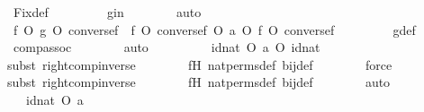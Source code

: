 \begin{isabellebody}
\ Fix{\isacharunderscore}{\kern0pt}def\ \isanewline
\ \ \ \ \ \ \isamarkupfalse%
\ gin\isanewline
\ \ \ \ \ \ \isamarkupfalse%
\ auto\isanewline
\isanewline
\ \ \ \ \isamarkupfalse%
\ {\isachardoublequoteopen}f\ O\ g\ O\ converse{\isacharparenleft}{\kern0pt}f{\isacharparenright}{\kern0pt}\ {\isacharequal}{\kern0pt}\ {\isacharparenleft}{\kern0pt}f\ O\ converse{\isacharparenleft}{\kern0pt}f{\isacharparenright}{\kern0pt}{\isacharparenright}{\kern0pt}\ O\ a\ O\ {\isacharparenleft}{\kern0pt}f\ O\ converse{\isacharparenleft}{\kern0pt}f{\isacharparenright}{\kern0pt}{\isacharparenright}{\kern0pt}{\isachardoublequoteclose}\ \isanewline
\ \ \ \ \ \ \isamarkupfalse%
\ g{\isacharunderscore}{\kern0pt}def\isanewline
\ \ \ \ \ \ \isamarkupfalse%
\ comp{\isacharunderscore}{\kern0pt}assoc\isanewline
\ \ \ \ \ \ \isamarkupfalse%
\ auto\isanewline
\ \ \ \ \isamarkupfalse%
\ \isamarkupfalse%
\ {\isachardoublequoteopen}{\isachardot}{\kern0pt}{\isachardot}{\kern0pt}{\isachardot}{\kern0pt}\ {\isacharequal}{\kern0pt}\ id{\isacharparenleft}{\kern0pt}nat{\isacharparenright}{\kern0pt}\ O\ {\isacharparenleft}{\kern0pt}a\ O\ id{\isacharparenleft}{\kern0pt}nat{\isacharparenright}{\kern0pt}{\isacharparenright}{\kern0pt}{\isachardoublequoteclose}\ \isanewline
\ \ \ \ \ \ \isamarkupfalse%
{\isacharparenleft}{\kern0pt}subst\ right{\isacharunderscore}{\kern0pt}comp{\isacharunderscore}{\kern0pt}inverse{\isacharparenright}{\kern0pt}\isanewline
\ \ \ \ \ \ \isamarkupfalse%
\ fH\ nat{\isacharunderscore}{\kern0pt}perms{\isacharunderscore}{\kern0pt}def\ bij{\isacharunderscore}{\kern0pt}def\isanewline
\ \ \ \ \ \ \isamarkupfalse%
\ force\isanewline
\ \ \ \ \ \ \isamarkupfalse%
{\isacharparenleft}{\kern0pt}subst\ right{\isacharunderscore}{\kern0pt}comp{\isacharunderscore}{\kern0pt}inverse{\isacharparenright}{\kern0pt}\isanewline
\ \ \ \ \ \ \isamarkupfalse%
\ fH\ nat{\isacharunderscore}{\kern0pt}perms{\isacharunderscore}{\kern0pt}def\ bij{\isacharunderscore}{\kern0pt}def\isanewline
\ \ \ \ \ \ \isamarkupfalse%
\ auto\isanewline
\ \ \ \ \isamarkupfalse%
\ \isamarkupfalse%
\ {\isachardoublequoteopen}{\isachardot}{\kern0pt}{\isachardot}{\kern0pt}{\isachardot}{\kern0pt}\ {\isacharequal}{\kern0pt}\ id{\isacharparenleft}{\kern0pt}nat{\isacharparenright}{\kern0pt}\ O\ a{\isachardoublequoteclose}\ \isanewline
\ \ \ \ \ \ \isamarkupfalse%

\end{isabellebody}
